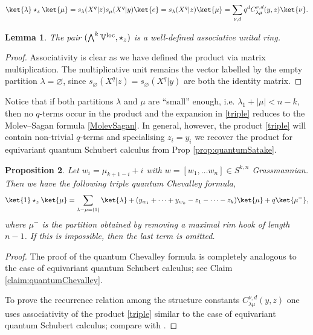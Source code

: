\documentclass[12pt]{amsart}
\newcommand{\mb}[1]{\mathbb{#1}}
\newtheorem{prop}{Proposition}[section]
\newtheorem{lemma}[prop]{Lemma}
\numberwithin{equation}{section}
\numberwithin{figure}{section}
\begin{document}
\begin{equation}\label{triple}
    \ket{\lambda}\star_z\ket{\mu}=s_{\lambda}(X^q|z)s_{\mu}(X^q|y)\ket{e} = s_{\lambda}(X^q|z) \ket{\mu} = \sum\limits_{\nu,d} q^d C^{\nu,d}_{\lambda\mu}(y,z) \ket{\nu}.
\end{equation}
\begin{lemma}
    The pair $(\bigwedge^k\mb{V}^{\rm loc},\star_z)$ is a well-defined associative unital ring.
\end{lemma}
\begin{proof}
    Associativity is clear as we have defined the product via matrix multiplication. The multiplicative unit remains the vector labelled by the empty partition $\lambda=\varnothing$, since $s_\varnothing(X^q|z)=s_\varnothing(X^q|y)$ are both the identity matrix.
\end{proof}
Notice that if both partitions $\lambda$ and $\mu$ are ``small'' enough, i.e. $\lambda_1+|\mu|< n-k$, then no $q$-terms occur in the product and the expansion in \eqref{triple} reduces to the Molev--Sagan formula \eqref{MolevSagan}. In general, however, the product \eqref{triple} will contain non-trivial $q$-terms and specialising $z_i = y_i$ we recover the product for equivariant quantum Schubert calculus from Prop \ref{prop:quantumSatake}. 

\begin{prop}
    Let $w_i=\mu_{k+1-i}+i$ with $w=[w_1,\ldots w_n]\in S^{k,n}$ Grassmannian. Then we have the following triple quantum Chevalley formula,
    \[
    \ket{1}\star_z\ket{\mu}=\sum_{\lambda-\mu=(1)}\ket{\lambda}+(y_{w_1}+\cdots+y_{w_k}-z_1-\cdots-z_k)\ket{\mu}+q\ket{\mu^-},
    \]
    where $\mu^-$ is the partition obtained by removing a maximal rim hook of length $n-1$. If this is impossible, then the last term is omitted. 
\end{prop}
\begin{proof}
    The proof of the quantum Chevalley formula is completely analogous to the case of equivariant quantum Schubert calculus; see Claim \ref{claim:quantumChevalley}.

    To prove the recurrence relation among the structure constants $C_{\lambda\mu}^{\nu,d}(y,z)$ one uses associativity of the product \eqref{triple} similar to the case of equivariant quantum Schubert calculus; compare with \cite{MihalceaAIM}.
\end{proof}
\end{document}
